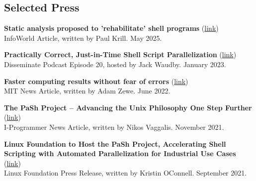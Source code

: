 \documentclass[margin]{res}
\begin{document}
\begin{resume}

\section{Selected Press}
\hypertarget{sec:press}{}

\textbf{Static analysis proposed to 'rehabilitate' shell programs} (\href{https://www.infoworld.com/article/3977802/static-analysis-proposed-to-rehabilitate-shell-programs.html}{link}) \\
InfoWorld Article, written by Paul Krill. May 2025.

\textbf{Practically Correct, Just-in-Time Shell Script Parallelization} (\href{https://disseminatepodcast.podcastpage.io/episode/konstantinos-kallas-practically-correct-just-in-time-shell-script-parallelization-20}{link}) \\
Disseminate Podcast Episode 20, hosted by Jack Waudby. January 2023.

\textbf{Faster computing results without fear of errors} (\href{https://news.mit.edu/2022/faster-unix-computing-program-0607}{link}) \\
MIT News Article, written by Adam Zewe. June 2022.

\textbf{The PaSh Project -- Advancing the Unix Philosophy One Step Further} (\href{https://www.i-programmer.info/news/90-tools/14990-the-pash-project-advancing-the-unix-philosophy-one-step-further.html}{link}) \\
I-Programmer News Article, written by Nikos Vaggalis. November 2021.

\textbf{Linux Foundation to Host the PaSh Project, Accelerating Shell Scripting with Automated Parallelization for Industrial Use Cases} (\href{https://www.linuxfoundation.org/press/press-release/linux-foundation-to-host-the-pash-project-accelerating-shell-scripting-with-automated-parallelization-for-industrial-use-cases}{link}) \\
Linux Foundation Press Release, written by Kristin OConnell. September 2021.





\end{resume}
\end{document}
